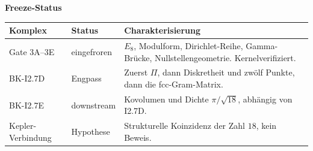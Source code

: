 \documentclass[11pt,a4paper]{article}
\begin{document}
\noindent
\begin{minipage}{\textwidth}
\textbf{Freeze-Status}

\vspace{0.7em}
\renewcommand{\arraystretch}{1.25}
\begin{tabular}{@{}ll>{\raggedright\arraybackslash}p{6.4cm}@{}}
  \toprule
  Komplex & Status & Charakterisierung \\
  \midrule
  Gate 3A--3E & eingefroren &
  $E_8$, Modulform, Dirichlet-Reihe, Gamma-Br\"ucke,
  Nullstellengeometrie. Kernelverifiziert. \\
  BK-I2.7D & Engpass &
  Zuerst $\Pi$, dann Diskretheit und zw\"olf Punkte, dann die
  fcc-Gram-Matrix. \\
  BK-I2.7E & downstream &
  Kovolumen und Dichte $\pi/\sqrt{18}$, abh\"angig von I2.7D. \\
  Kepler-Verbindung & Hypothese &
  Strukturelle Koinzidenz der Zahl $18$, kein Beweis. \\
  \bottomrule
\end{tabular}
\end{minipage}
\end{document}

